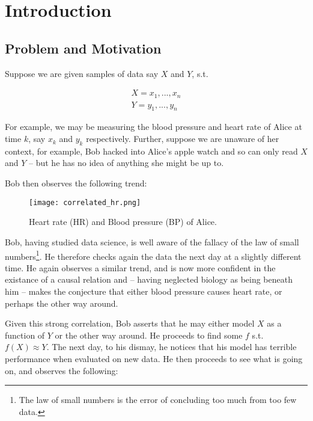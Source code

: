 
\chapter{Introduction}

\section{Problem and Motivation}

Suppose we are given samples of data say $X$ and $Y$, s.t.

\begin{align*}
    X = x_1, ..., x_n  \\
    Y = y_1, ..., y_n 
\end{align*}

For example, we may be measuring the blood pressure and heart rate of Alice at time $k$, 
say $x_k$ and $y_k$ respectively. Further, suppose we are unaware of her context, for example,
Bob hacked into Alice's apple watch and so can only read $X$ and $Y$ -- but he has no idea of 
anything she might be up to.

Bob then observes the following trend:

\begin{figure}[H]
    \centering
    \texttt{[image: correlated\_hr.png]}
    \caption{Heart rate (HR) and Blood pressure (BP) of Alice.}
\end{figure}

Bob, having studied data science, is well aware of the fallacy of the law of small numbers\footnote{
    The law of small numbers is the error of concluding too much from too few data. 
}. He therefore checks again the data the next day at a slightly different time. He again observes 
a similar trend, and is now more confident in the existance of a causal relation and -- having neglected biology as 
being beneath him -- makes the conjecture that either blood pressure causes heart rate, or 
perhaps the other way around. 

Given this strong correlation, Bob asserts that he may either model $X$ as a function of $Y$ or the other way 
around. He proceeds to find some $f$ s.t. $f(X) \approx Y$. The next day, to his dismay, he notices that his
model has terrible performance when evaluated on new data. He then proceeds to see what is going on, and 
observes the following:


